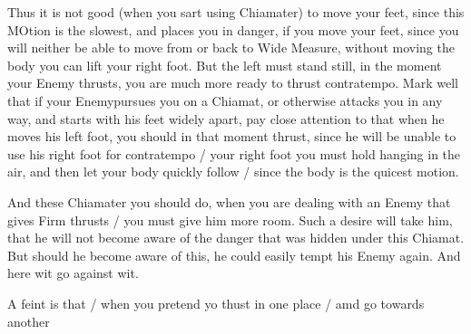 Thus it is not good (when you sart using Chiamater) to move your feet,
since this MOtion is the slowest, and places you in danger, if you
move your feet, since you will neither be able to move from or back to
Wide Measure, without moving the body you can lift your right
foot. But the left must stand still, in the moment your Enemy thrusts,
you are much more ready to thrust contratempo. Mark well that if your
Enemypursues you on a Chiamat, or otherwise attacks you in any way, and
starts with his feet widely apart, pay close attention to that when he
moves his left foot, you should in that moment thrust, since he will
be unable to use his right foot for contratempo / your right foot you
must hold hanging in the air, and then let
your body quickly follow / since the body is the quicest motion.


And these Chiamater you should do, when you are dealing with an Enemy
that gives Firm thrusts / you must give him more room. Such a desire
will take him, that he will not become aware of the danger that was
hidden under this Chiamat. But should he become aware of this, he could
easily tempt his Enemy again. And here wit go against wit.




A feint is that / when you pretend yo thust in one place / amd go
towards another